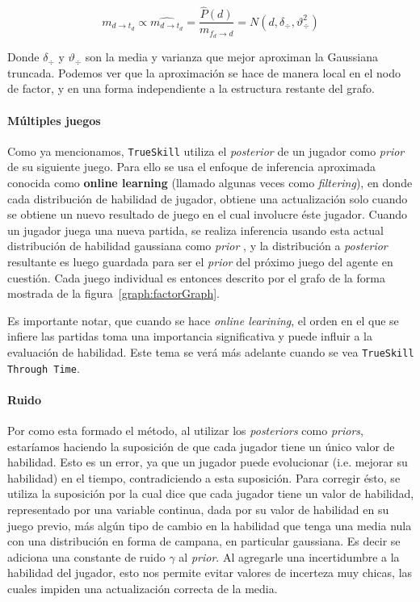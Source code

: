 \documentclass[11pt,twoside, spanish]{report} %
\begin{document}
\begin{equation}
 m_{d \rightarrow t_d} \propto\widehat{m_{d \rightarrow t_d}} = \frac{\widehat{P}(d)}{m_{f_d \rightarrow d}} = N(d,\delta_{\div},\vartheta_{\div}^2 )
\end{equation}

Donde $\delta_{\div}$ y $\vartheta_{\div}$ son la media y varianza que mejor aproximan la Gaussiana truncada.
Podemos ver que la aproximaci\'on se hace de manera local en el nodo de factor, y en una forma independiente a la estructura restante del grafo.


\paragraph{M\'ultiples juegos}
Como ya mencionamos, \texttt{TrueSkill} utiliza el \textit{posterior} de un jugador como \textit{prior} de su siguiente juego.
Para ello se usa el enfoque de inferencia aproximada conocida como \textbf{online learning} (llamado algunas veces como \textit{filtering}), en donde cada distribuci\'on de habilidad de jugador, obtiene una actualizaci\'on solo cuando se obtiene un nuevo resultado de juego en el cual involucre \'este jugador.
Cuando un jugador juega una nueva partida, se realiza inferencia usando esta actual distribuci\'on de habilidad gaussiana como \textit{prior} , y la distribuci\'on a \textit{posterior} resultante es luego guardada para ser el \textit{prior} del pr\'oximo juego del agente en cuesti\'on.
Cada juego individual es entonces descrito por el grafo de la forma mostrada de la figura~\ref{graph:factorGraph}.

Es importante notar, que cuando se hace \textit{online learining}, el orden en el que se infiere las partidas toma una importancia significativa y  puede influir a la evaluaci\'on de habilidad.
Este tema se ver\'a m\'as adelante cuando se vea \texttt{TrueSkill Through Time}.


\paragraph{Ruido}
Por como esta formado el m\'etodo, al utilizar los \textit{posteriors} como \textit{priors}, estar\'iamos haciendo la suposici\'on de que cada jugador tiene un \'unico valor de habilidad.
Esto es un error, ya que un jugador puede evolucionar (i.e. mejorar su habilidad) en el tiempo, contradiciendo a esta suposici\'on.
Para corregir \'esto, se utiliza la suposici\'on por la cual dice que cada jugador tiene un valor de habilidad, representado por una variable continua, dada por su valor de habilidad en su juego previo, m\'as alg\'un tipo de cambio en la habilidad que tenga una media nula con una distribuci\'on en forma de campana, en particular gaussiana.
Es decir se adiciona una constante de ruido $\gamma$ al \textit{prior}.
Al agregarle una incertidumbre a la habilidad del jugador, esto nos permite evitar valores de incerteza muy chicas, las cuales impiden una actualizaci\'on correcta de la media.
\end{document}
